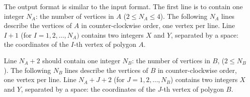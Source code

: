 The output format is similar to the input format. The first line is to contain one integer $N_A$: the number of vertices in $A$ ($2 \le N_A \le 4$). The following $N_A$ lines describe the vertices of $A$ in counter-clockwise order, one vertex per line. Line $I+1$ (for $I = 1, 2, \ldots, N_A)$ contains two integers $X$ and $Y$, separated by a space: the coordinates of the $I$-th vertex of polygon $A$. 

Line $N_A+2$ should contain one integer $N_B$: the number of vertices in $B$, ($2 \le N_B$). The following $N_B$ lines describe the vertices of $B$ in counter-clockwise order, one vertex per line. Line $N_A+J+2$ (for $J = 1, 2, \ldots, N_B$) contains two integers $X$ and $Y$, separated by a space: the coordinates of the $J$-th vertex of polygon $B$.
